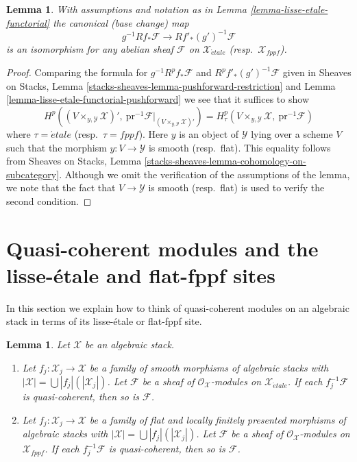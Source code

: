 \documentclass{stacks-project}
\theoremstyle{plain}
\newtheorem{lemma}[subsection]{Lemma}
\theoremstyle{definition}
\theoremstyle{remark}
\numberwithin{equation}{subsection}
\def\etale{{\acute{e}tale}}
\begin{document}
\begin{lemma}
\label{lemma-lisse-etale-functorial-cohomology}
With assumptions and notation as in Lemma \ref{lemma-lisse-etale-functorial}
the canonical (base change) map
$$
g^{-1}Rf_*\mathcal{F} \longrightarrow Rf'_*(g')^{-1}\mathcal{F}
$$
is an isomorphism for any abelian sheaf $\mathcal{F}$
on $\mathcal{X}_\etale$ (resp.\ $\mathcal{X}_{fppf}$).
\end{lemma}

\begin{proof}
Comparing the formula for $g^{-1}R^pf_*\mathcal{F}$
and $R^pf'_*(g')^{-1}\mathcal{F}$ given in
Sheaves on Stacks, Lemma \ref{stacks-sheaves-lemma-pushforward-restriction}
and Lemma \ref{lemma-lisse-etale-functorial-pushforward}
we see that it suffices to show
$$
H^p((V \times_{y, \mathcal{Y}} \mathcal{X})',
\ \text{pr}^{-1}\mathcal{F}|_{(V \times_{y, \mathcal{Y}} \mathcal{X})'})
=
H^p_\tau(V \times_{y, \mathcal{Y}} \mathcal{X},\ \text{pr}^{-1}\mathcal{F})
$$
where $\tau = \etale$ (resp.\ $\tau = fppf$). Here $y$ is an object
of $\mathcal{Y}$ lying over a scheme $V$ such that the morphism
$y : V \to \mathcal{Y}$ is smooth (resp.\ flat).
This equality follows from
Sheaves on Stacks, Lemma \ref{stacks-sheaves-lemma-cohomology-on-subcategory}.
Although we omit the verification of the assumptions
of the lemma, we note that the fact that $V \to \mathcal{Y}$ is smooth
(resp.\ flat) is used to verify the second condition.
\end{proof}






\section{Quasi-coherent modules and the lisse-\'etale and flat-fppf sites}
\label{section-quasi-coherent-modules-II}

\noindent
In this section we explain how to think of quasi-coherent modules
on an algebraic stack in terms of its lisse-\'etale or flat-fppf site.

\begin{lemma}
\label{lemma-check-qc-on-etale-covering}
Let $\mathcal{X}$ be an algebraic stack.
\begin{enumerate}
\item Let $f_j : \mathcal{X}_j \to \mathcal{X}$ be a family of smooth
morphisms of algebraic stacks with
$|\mathcal{X}| =\bigcup |f_j|(|\mathcal{X}_j|)$.
Let $\mathcal{F}$ be a sheaf of $\mathcal{O}_\mathcal{X}$-modules
on $\mathcal{X}_\etale$. If each $f_j^{-1}\mathcal{F}$
is quasi-coherent, then so is $\mathcal{F}$.
\item Let $f_j : \mathcal{X}_j \to \mathcal{X}$ be a family of flat and
locally finitely presented morphisms of algebraic stacks with
$|\mathcal{X}| =\bigcup |f_j|(|\mathcal{X}_j|)$.
Let $\mathcal{F}$ be a sheaf of $\mathcal{O}_\mathcal{X}$-modules
on $\mathcal{X}_{fppf}$. If each $f_j^{-1}\mathcal{F}$
is quasi-coherent, then so is $\mathcal{F}$.
\end{enumerate}
\end{lemma}
\end{document}
